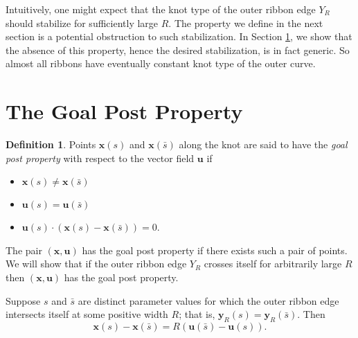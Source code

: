 \documentclass[12pt]{article}
\numberwithin{equation}{subsection}
\theoremstyle{definition}
\newtheorem*{defin}{Definition}
\numberwithin{lem}{section}
\def\vv{\vspace{0.2in}}
\begin{document}

Intuitively, one might expect that the knot type of the outer ribbon edge $Y_R$ should stabilize for sufficiently large $R$.  The property we define in the next section is a potential obstruction to such stabilization. In Section \ref{sec:goalpost}, we show that the absence of this property, hence the desired stabilization, is in fact generic. So almost all ribbons have eventually constant knot type of the outer curve.





\section{The Goal Post Property}
\label{sec:goalpost}

\begin{defin}
Points $\mathbf{x}(s)$ and $\mathbf{x}(\bar{s})$ along the knot are said to have the \emph{goal post property} with respect to the vector field $\mathbf{u}$ if 
\begin{itemize}
\item $\mathbf{x}(s) \neq \mathbf{x}(\bar{s})$
\item $\mathbf{u}(s) = \mathbf{u}(\bar{s})$ 
\item $\mathbf{u}(s) \cdot \left(\mathbf{x}(s)-\mathbf{x}(\bar{s})\right) = 0$.
\end{itemize}
\end{defin}

The pair $(\mathbf{x},\mathbf{u})$ has the goal post property if there exists such a pair of points. We will show that if the outer ribbon edge $Y_R$ crosses itself for arbitrarily large $R$ then $(\mathbf{x},\mathbf{u})$ has the goal post property.

\vv
Suppose  $s$ and  $\bar{s}$ are distinct parameter values for which the outer ribbon edge intersects itself at some positive width $R$; that is, $\mathbf{y}_{R}(s) = \mathbf{y}_{R}(\bar{s})$.  Then
\begin{equation}\label{EqnForCrossing}
\mathbf{x}(s) - \mathbf{x}(\bar{s}) = R(\mathbf{u}(\bar{s}) - \mathbf{u}(s)). 
\end{equation}
\end{document}
